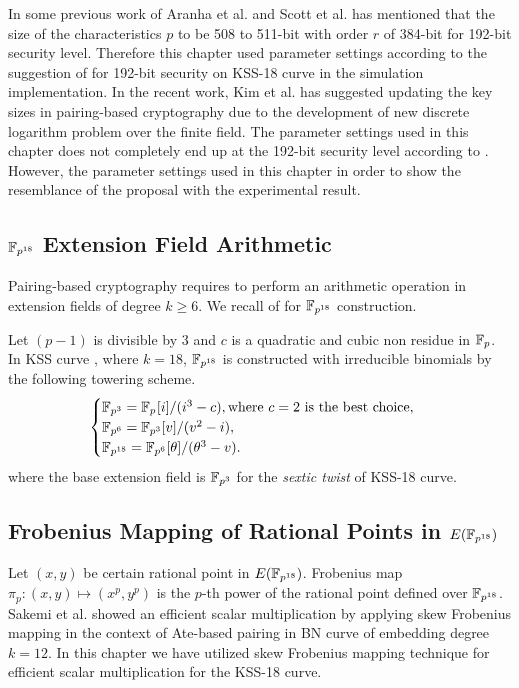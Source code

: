 In some previous work of  Aranha et al. \cite{PAIRING:AFKMR12} and Scott et al. \cite{IMA:Scott11} has mentioned that the size of the characteristics $p$ to be 508 to 511-bit with order $r$ of 384-bit  for 192-bit security level.  
Therefore this chapter used parameter settings according to the suggestion of \cite{PAIRING:AFKMR12} for 192-bit security on KSS-18 curve in the simulation implementation. In the recent work, Kim et al. \cite{C:KimBar16} has suggested updating the key sizes in pairing-based cryptography due to the development of new discrete logarithm problem over the finite field. The parameter settings used in this chapter does not completely end up at the 192-bit security level according to \cite{C:KimBar16}. However, the parameter settings used in this chapter in order to show the resemblance of the proposal with the experimental result.

\subsection{\texorpdfstring{$\mathbb{F}_{p^{18}}$}{Fp18} Extension Field Arithmetic}
Pairing-based cryptography requires to perform an arithmetic operation in extension fields of degree $k \geq 6$\cite{Silverman}. 
We recall  of  for $\mathbb{F}_{p^{18}}$ construction.

Let $(p-1)$ is divisible by 3 and $c$ is a quadratic and cubic non residue in ${\mathbb{F}}_{p}$. In KSS curve \cite{EPRINT:KacSchSco07}, where $k=18$, $\mathbb{F}_{p^{18}}$ is constructed  with irreducible binomials by the following towering scheme.
\begin{equation}
\begin{cases}
{\mathbb{F}}_{p^{3}} = {\mathbb{F}}_{p^{}}[i]/(i^3-c),  \text{where $c = 2$ is the best choice,}\nonumber \\ 
{\mathbb{F}}_{p^{6}} = {\mathbb{F}}_{p^{3}}[v]/(v^2-i), \nonumber \\ 
{\mathbb{F}}_{p^{18}} = {\mathbb{F}}_{p^{6}}[\theta]/(\theta^3-v). \nonumber \\ 
\end{cases}
\end{equation}\label{eq:KSS18_towering_chapter_g2scm_kss18}
where the base extension field is $\mathbb{F}_{p^3}$ for the \textit{sextic twist} of KSS-18 curve.

\subsection{Frobenius Mapping of Rational Points in  \texorpdfstring{ $E(\mathbb{F}_{p^{18}})$}{E(Fp18)}} 
Let $(x,y)$ be certain rational point in $E(\mathbb{F}_{p^{18}})$. 
Frobenius map $\pi_p : (x,y) \mapsto  (x^p,y^p)$ is the $p$-th power of the rational point defined over $\mathbb{F}_{p^{18}}$. 
Sakemi et al. \cite{CANS:SNOKM08} showed an efficient scalar multiplication by applying skew Frobenius mapping in the context of Ate-based pairing in BN curve of embedding degree $k=12$.  In this chapter we have utilized skew Frobenius mapping technique for efficient scalar multiplication for the KSS-18 curve.

